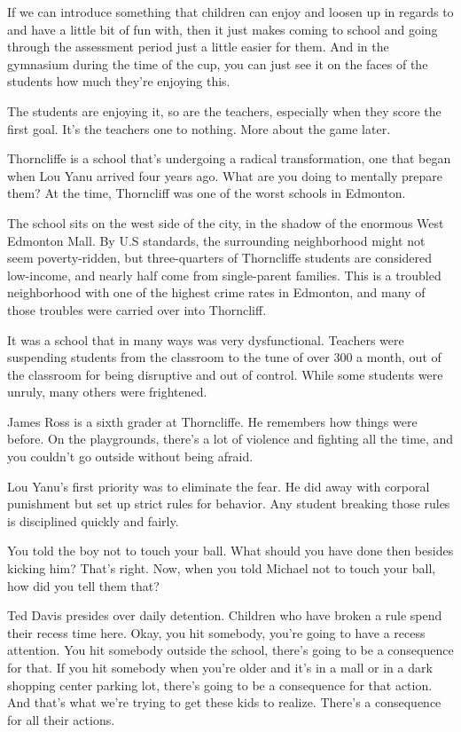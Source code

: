 If we can introduce something that children can enjoy and loosen up in regards to and have a little bit of fun with, then it just makes coming to school and going through the assessment period just a little easier for them. And in the gymnasium during the time of the cup, you can just see it on the faces of the students how much they're enjoying this.

The students are enjoying it, so are the teachers, especially when they score the first goal. It's the teachers one to nothing. More about the game later.

Thorncliffe is a school that's undergoing a radical transformation, one that began when Lou Yanu arrived four years ago. What are you doing to mentally prepare them? At the time, Thorncliff was one of the worst schools in Edmonton.

The school sits on the west side of the city, in the shadow of the enormous West Edmonton Mall. By U.S standards, the surrounding neighborhood might not seem poverty-ridden, but three-quarters of Thorncliffe students are considered low-income, and nearly half come from single-parent families. This is a troubled neighborhood with one of the highest crime rates in Edmonton, and many of those troubles were carried over into Thorncliff.

It was a school that in many ways was very dysfunctional. Teachers were suspending students from the classroom to the tune of over 300 a month, out of the classroom for being disruptive and out of control. While some students were unruly, many others were frightened.

James Ross is a sixth grader at Thorncliffe. He remembers how things were before. On the playgrounds, there's a lot of violence and fighting all the time, and you couldn't go outside without being afraid.

Lou Yanu's first priority was to eliminate the fear. He did away with corporal punishment but set up strict rules for behavior. Any student breaking those rules is disciplined quickly and fairly.

You told the boy not to touch your ball. What should you have done then besides kicking him? That's right. Now, when you told Michael not to touch your ball, how did you tell them that?

Ted Davis presides over daily detention. Children who have broken a rule spend their recess time here. Okay, you hit somebody, you're going to have a recess attention. You hit somebody outside the school, there's going to be a consequence for that. If you hit somebody when you're older and it's in a mall or in a dark shopping center parking lot, there's going to be a consequence for that action. And that's what we're trying to get these kids to realize. There's a consequence for all their actions.

